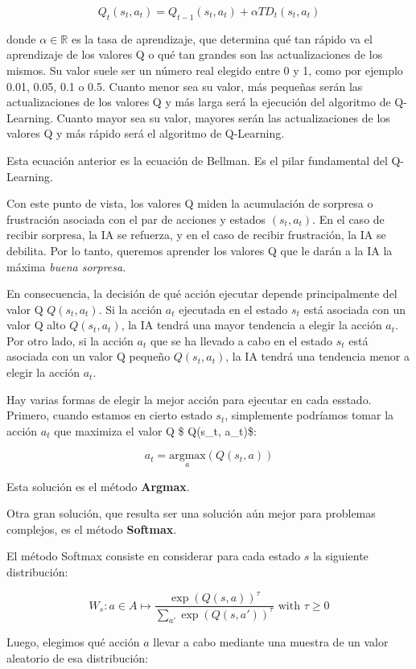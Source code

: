 \documentclass[]{book}
\begin{document}
\[Q_t(s_t,a_t) = Q_{t-1}(s_t,a_t) + \alpha TD_t(s_t,a_t)\]

donde \(\alpha \in \mathbb{R}\) es la tasa de aprendizaje, que determina qué tan rápido va el aprendizaje de los valores Q o qué tan grandes son las actualizaciones de los mismos. Su valor suele ser un número real elegido entre 0 y 1, como por ejemplo 0.01, 0.05, 0.1 o 0.5. Cuanto menor sea su valor, más pequeñas serán las actualizaciones de los valores Q y más larga será la ejecución del algoritmo de Q-Learning. Cuanto mayor sea su valor, mayores serán las actualizaciones de los valores Q y más rápido será el algoritmo de Q-Learning.

Esta ecuación anterior es la ecuación de Bellman. Es el pilar fundamental del Q-Learning.

Con este punto de vista, los valores Q miden la acumulación de sorpresa o frustración asociada con el par de acciones y estados \((s_t, a_t)\). En el caso de recibir sorpresa, la IA se refuerza, y en el caso de recibir frustración, la IA se debilita. Por lo tanto, queremos aprender los valores Q que le darán a la IA la máxima \emph{buena sorpresa}.

En consecuencia, la decisión de qué acción ejecutar depende principalmente del valor Q \(Q(s_t, a_t)\). Si la acción \(a_t\) ejecutada en el estado \(s_t\) está asociada con un valor Q alto \(Q (s_t, a_t)\), la IA tendrá una mayor tendencia a elegir la acción \(a_t\). Por otro lado, si la acción \(a_t\) que se ha llevado a cabo en el estado \(s_t\) está asociada con un valor Q pequeño \(Q(s_t, a_t)\), la IA tendrá una tendencia menor a elegir la acción \(a_t\).

Hay varias formas de elegir la mejor acción para ejecutar en cada esstado. Primero, cuando estamos en cierto estado \(s_t\), simplemente podríamos tomar la acción \(a_t\) que maximiza el valor Q \$ Q(s\_t, a\_t)\$:

\[a_t = \underset{a}{\textrm{argmax}}(Q(s_t,a))\]

Esta solución es el método \textbf{Argmax}.

Otra gran solución, que resulta ser una solución aún mejor para problemas complejos, es el método \textbf{Softmax}.

El método Softmax consiste en considerar para cada estado \(s\) la siguiente distribución:

\[W_s: a \in A \mapsto \frac{\exp(Q(s,a))^{\tau}}{\sum_{a'}\exp(Q(s,a'))^{\tau}} \textrm{ with } \tau \ge 0\]

Luego, elegimos qué acción \(a\) llevar a cabo mediante una muestra de un valor aleatorio de esa distribución:
\end{document}
